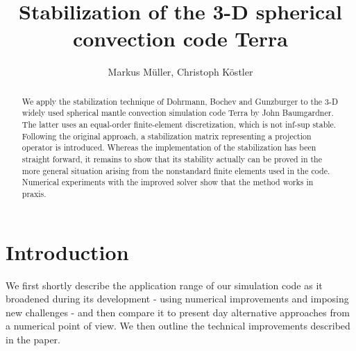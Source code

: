 \documentclass[times]{fldauth}
\title{Stabilization of the 3-D spherical convection code Terra}
\author{Markus M\"uller, Christoph K\"ostler}
\begin{document}
\maketitle

\begin{abstract}
We apply the stabilization technique of Dohrmann, Bochev and Gunzburger 
to the 3-D widely used spherical mantle convection simulation code Terra by John Baumgardner.
The latter uses an equal-order finite-element discretization, which is not inf-sup stable.
Following the original approach, a stabilization matrix representing a projection operator is introduced.
Whereas the implementation of the stabilization has been straight forward, it remains to show that its stability
actually can be proved in the more general situation arising  from the nonstandard finite elements used in the code.
Numerical experiments with the improved solver show that the method works in praxis. 
\end{abstract}




\section{Introduction}
We first shortly describe the application range of our simulation code as 
it broadened during its development - using numerical improvements and imposing new challenges - 
and then compare it to present day alternative approaches from a numerical point of view. 
We then outline the technical improvements described in the paper. 
\end{document}
